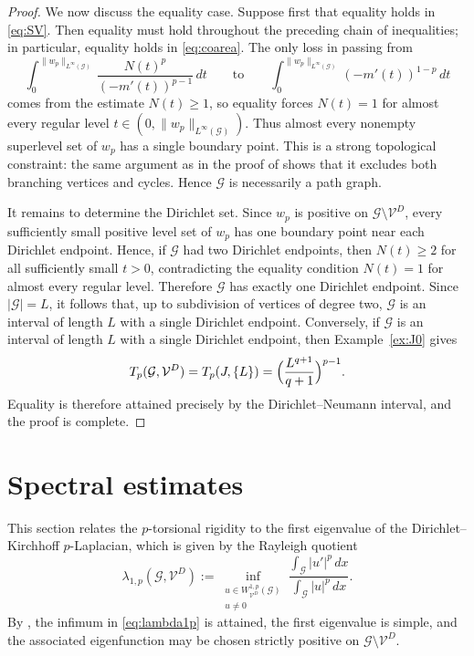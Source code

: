 \documentclass[12pt,a4paper]{article}
\numberwithin{equation}{section}
\begin{document}
\begin{proof}
	We now discuss the equality case. Suppose first that equality holds in
	\eqref{eq:SV}. Then equality must hold throughout the preceding chain
	of inequalities; in particular, equality holds in \eqref{eq:coarea}.
	The only loss in passing from
	\[
	\int_0^{\|w_p\|_{L^{\infty}(\mathcal{G})}}
	\frac{N(t)^p}{(-m'(t))^{p-1}}\,dt
	\qquad\text{to}\qquad
	\int_0^{\|w_p\|_{L^{\infty}(\mathcal{G})}}
	(-m'(t))^{1-p}\,dt
	\]
	comes from the estimate $N(t)\ge1$, so equality forces
	\(
	N(t)=1
 \)  for almost every regular level   \(t\in(0,\|w_p\|_{L^{\infty}(\mathcal{G})}).
	\)
	Thus almost every nonempty superlevel set of $w_p$ has a single
	boundary point. This is a strong topological constraint: the same
	argument as in the proof of \cite[Lemma~4.3]{BKKM17} shows that it
	excludes both branching vertices and cycles. Hence $\mathcal G$ is necessarily a path graph.
	
	It remains to determine the Dirichlet set. Since $w_p$ is positive on
	$\mathcal G\setminus\mathcal V^D$, every sufficiently small positive level
	set of $w_p$ has one boundary point near each Dirichlet endpoint.
	Hence, if $\mathcal G$ had two Dirichlet endpoints, then
	$N(t)\ge2$ for all sufficiently small $t>0$, contradicting the equality
	condition $N(t)=1$ for almost every regular level. Therefore
	$\mathcal G$ has exactly one Dirichlet endpoint. Since
	$|\mathcal G|=L$, it follows that, up to subdivision of vertices of
	degree two, $\mathcal G$ is an interval of length $L$ with a single
	Dirichlet endpoint.
	Conversely, if $\mathcal G$ is an interval of length $L$ with a single
	Dirichlet endpoint, then Example~\ref{ex:J0} gives
	\[
	T_p(\mathcal G,\mathcal{V}^D)
	=
	T_p(J,\{L\})
	=
	\Bigl(\frac{L^{q+1}}{q+1}\Bigr)^{p-1}.
	\]
	Equality is therefore attained precisely by the Dirichlet--Neumann
	interval, and the proof is complete.
\end{proof}
	\section{Spectral estimates}
	\label{sec:spectral}
	
	This section relates the $p$-torsional rigidity to the first eigenvalue of
	the Dirichlet--Kirchhoff $p$-Laplacian, which is given by the Rayleigh
	quotient
	\begin{equation}
		\label{eq:lambda1p}
		\lambda_{1,p}(\mathcal G,\mathcal{V}^D)
		:=
		\inf_{\substack{u\in W^{1,p}_{\mathcal{V}^D}(\mathcal G)\\ u\neq 0}}
		\frac{\int_{\mathcal G}|u'|^p\,dx}
		{\int_{\mathcal G}|u|^p\,dx}.
	\end{equation}
	By \cite[Theorems~3.1 and~3.3]{DR}, the infimum in \eqref{eq:lambda1p} is
	attained, the first eigenvalue is simple, and the associated eigenfunction
	may be chosen strictly positive on $\mathcal G\setminus \mathcal{V}^D$.
	
\end{document}
